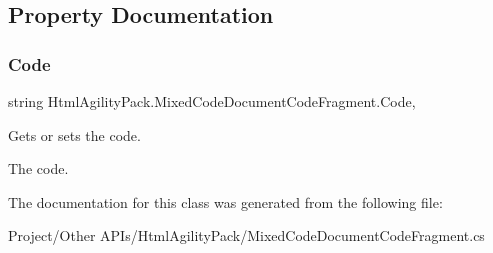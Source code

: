 \subsection{Property Documentation}
\mbox{\label{class_html_agility_pack_1_1_mixed_code_document_code_fragment_a2bb5d78b24b15aa76b540bca5284b357}} 
\subsubsection{\texorpdfstring{Code}{Code}}
{\footnotesize\ttfamily string Html\+Agility\+Pack.\+Mixed\+Code\+Document\+Code\+Fragment.\+Code\hspace{0.3cm}{\ttfamily [get]}, {\ttfamily [set]}}



Gets or sets the code. 

The code.

The documentation for this class was generated from the following file\+:\begin{DoxyCompactItemize}
\item 
Project/\+Other A\+P\+Is/\+Html\+Agility\+Pack/Mixed\+Code\+Document\+Code\+Fragment.\+cs\end{DoxyCompactItemize}
